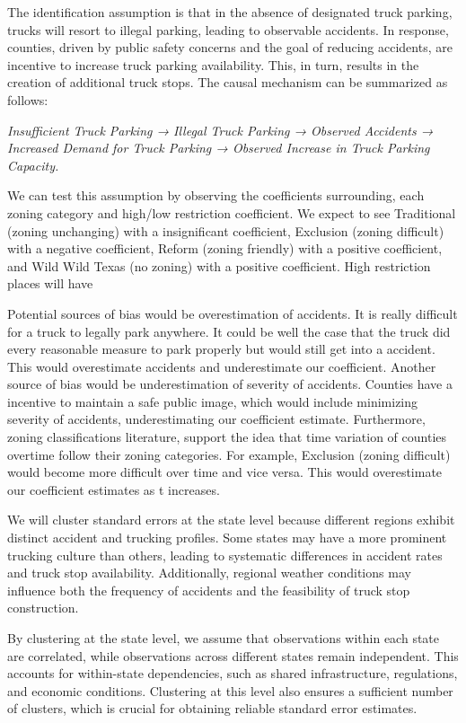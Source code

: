 \documentclass[
  8pt,
  12pt]{article}
\begin{document}
The identification assumption is that in the absence of designated truck
parking, trucks will resort to illegal parking, leading to observable
accidents. In response, counties, driven by public safety concerns and
the goal of reducing accidents, are incentive to increase truck parking
availability. This, in turn, results in the creation of additional truck
stops. The causal mechanism can be summarized as follows:

\emph{Insufficient Truck Parking → Illegal Truck Parking → Observed
Accidents → Increased Demand for Truck Parking → Observed Increase in
Truck Parking Capacity.}

We can test this assumption by observing the coefficients surrounding,
each zoning category and high/low restriction coefficient. We expect to
see Traditional (zoning unchanging) with a insignificant coefficient,
Exclusion (zoning difficult) with a negative coefficient, Reform (zoning
friendly) with a positive coefficient, and Wild Wild Texas (no zoning)
with a positive coefficient. High restriction places will have

Potential sources of bias would be overestimation of accidents. It is
really difficult for a truck to legally park anywhere. It could be well
the case that the truck did every reasonable measure to park properly
but would still get into a accident. This would overestimate accidents
and underestimate our coefficient. Another source of bias would be
underestimation of severity of accidents. Counties have a incentive to
maintain a safe public image, which would include minimizing severity of
accidents, underestimating our coefficient estimate. Furthermore, zoning
classifications literature, support the idea that time variation of
counties overtime follow their zoning categories. For example, Exclusion
(zoning difficult) would become more difficult over time and vice
versa\citep{mclaughlinLandUseRegulation2012}. This would overestimate
our coefficient estimates as t increases.

We will cluster standard errors at the state level because different
regions exhibit distinct accident and trucking profiles. Some states may
have a more prominent trucking culture than others, leading to
systematic differences in accident rates and truck stop availability.
Additionally, regional weather conditions may influence both the
frequency of accidents and the feasibility of truck stop construction.

By clustering at the state level, we assume that observations within
each state are correlated, while observations across different states
remain independent. This accounts for within-state dependencies, such as
shared infrastructure, regulations, and economic conditions. Clustering
at this level also ensures a sufficient number of clusters, which is
crucial for obtaining reliable standard error estimates.


  
\end{document}
